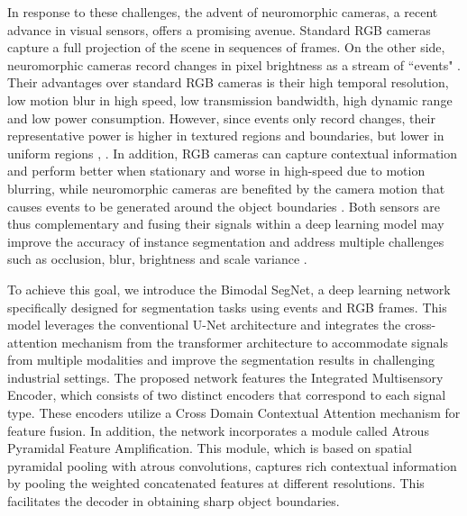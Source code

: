\documentclass[lettersize,journal]{IEEEtran}
\begin{document}
In response to these challenges, the advent of neuromorphic cameras, a recent advance in visual sensors, offers a promising avenue. Standard RGB cameras capture a full projection of the scene in sequences of frames. On the other side, neuromorphic cameras record changes in pixel brightness as a stream of “events" \cite{Liao2021NeuromorphicPerspectives}. Their advantages over standard RGB cameras is their high temporal resolution, low motion blur in high speed, low transmission bandwidth, high dynamic range and low power consumption. However, since events only record changes, their representative power is higher in textured regions  and boundaries, but lower in uniform regions \cite{Huang2020NeuromorphicApplications}, \cite{Muthusamy2021NeuromorphicServoing}. In addition, RGB cameras can capture contextual information and perform better when stationary and worse in high-speed due to motion blurring, while neuromorphic cameras are benefited by the camera motion that causes events to be generated around the object boundaries \cite{Muthusamy2020NeuromorphicManipulation}. Both sensors are thus complementary and fusing their signals within a deep learning model may improve the accuracy of instance segmentation and address multiple challenges such as occlusion, blur, brightness and scale variance \cite{Gehrig2021CombiningPrediction, Qingyun2022Cross-modalityImagery}.


To achieve this goal, we introduce the Bimodal SegNet, a deep learning network specifically designed for segmentation tasks using events and RGB frames. This model leverages the conventional U-Net architecture \cite{Ronneberger2015U-Net:Segmentation} and integrates the cross-attention mechanism from the transformer architecture \cite{Liu2022CMX:Transformers} to accommodate signals from multiple modalities and improve the segmentation results in challenging industrial settings. The proposed network features the Integrated Multisensory Encoder, which consists of two distinct encoders that correspond to each signal type. These encoders utilize a Cross Domain Contextual Attention mechanism for feature fusion. In addition, the network incorporates a module called Atrous Pyramidal Feature Amplification. This module, which is based on spatial pyramidal pooling with atrous convolutions\cite{Chen2018Encoder-DecoderSegmentation}, captures rich contextual information by pooling the weighted concatenated features at different resolutions. This facilitates the decoder in obtaining sharp object boundaries.
\end{document}
